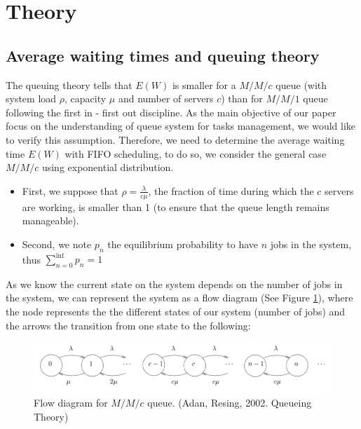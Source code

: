 \documentclass{article}
\begin{document}
    \newpage

    \section{Theory}

    \subsection*{Average waiting times and queuing theory}

    The queuing theory tells that $E(W)$ is smaller for a $M/M/c$ queue (with system load $\rho$, capacity $\mu$ and number of servers $c$) than for $M/M/1$ queue following the first in - first out discipline.
    As the main objective of our paper focus on the understanding of queue system for tasks management, we would like to verify this assumption. Therefore, we need to determine the average waiting time $E(W)$ with FIFO scheduling, to do so, we consider the general case $M/M/c$ using exponential distribution.\\
    \begin{itemize}
        \item First, we suppose that $\rho = \frac{\lambda}{c\mu}$, the fraction of time during which the $c$ servers are working, is smaller than 1 (to ensure that the queue length remains manageable).
        \item Second, we note $p_n$ the equilibrium probability to have $n$ jobs in the system, thus $\sum_{n=0}^{\inf} p_n = 1$
    \end{itemize}

    As we know the current state on the system depends on the number of jobs in the system, we can represent the system as a flow diagram (See Figure \ref{fig:flow_diagram_mmc}), where the node represents the  the different states of our system (number of jobs) and the arrows the transition from one state to the following:

    \begin{figure}[!ht]
        \centering
        \includegraphics[width=.9\textwidth]{pictures/part_1/flow_diagram_mmc.png}
        \caption{Flow diagram for $M/M/c$ queue. (Adan, Resing, 2002.  Queueing Theory)}
        \label{fig:flow_diagram_mmc}
    \end{figure}
\end{document}
